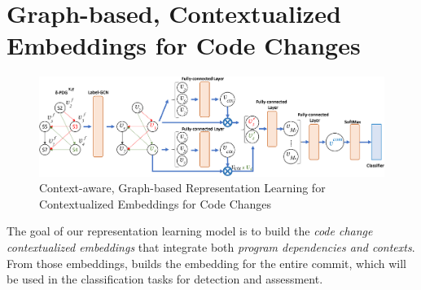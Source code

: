 
\section{Graph-based, Contextualized Embeddings for Code Changes}
\label{embedding:sec}

\begin{figure}[t]
	\centering
	\includegraphics[width=5.8in]{graphs/model-4.png}
	\vspace{-10pt}
	\caption{Context-aware, Graph-based Representation Learning for Contextualized Embeddings for Code Changes}
	\label{fig:step-2}
\end{figure}

The goal of our representation learning model is to build the {\em
  code change contextualized embeddings} that integrate both {\em
  program dependencies and contexts}.  From those embeddings, {\tool}
builds the embedding for the entire commit, which will be used in the
classification tasks for detection and assessment.



